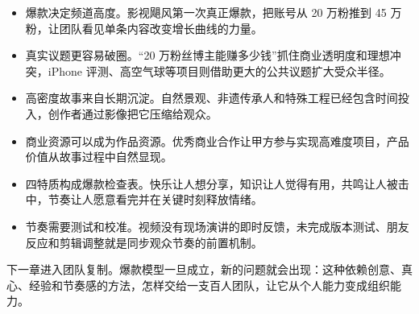 \begin{itemize}
  \item 爆款决定频道高度。影视飓风第一次真正爆款，把账号从 20 万粉推到 45 万粉，让团队看见单条内容改变增长曲线的力量。
  \item 真实议题更容易破圈。“20 万粉丝博主能赚多少钱”抓住商业透明度和理想冲突，iPhone 评测、高空气球等项目则借助更大的公共议题扩大受众半径。
  \item 高密度故事来自长期沉淀。自然景观、非遗传承人和特殊工程已经包含时间投入，创作者通过影像把它压缩给观众。
  \item 商业资源可以成为作品资源。优秀商业合作让甲方参与实现高难度项目，产品价值从故事过程中自然显现。
  \item 四特质构成爆款检查表。快乐让人想分享，知识让人觉得有用，共鸣让人被击中，节奏让人愿意看完并在关键时刻释放情绪。
  \item 节奏需要测试和校准。视频没有现场演讲的即时反馈，未完成版本测试、朋友反应和剪辑调整就是同步观众节奏的前置机制。
\end{itemize}

下一章进入团队复制。爆款模型一旦成立，新的问题就会出现：这种依赖创意、真心、经验和节奏感的方法，怎样交给一支百人团队，让它从个人能力变成组织能力。
